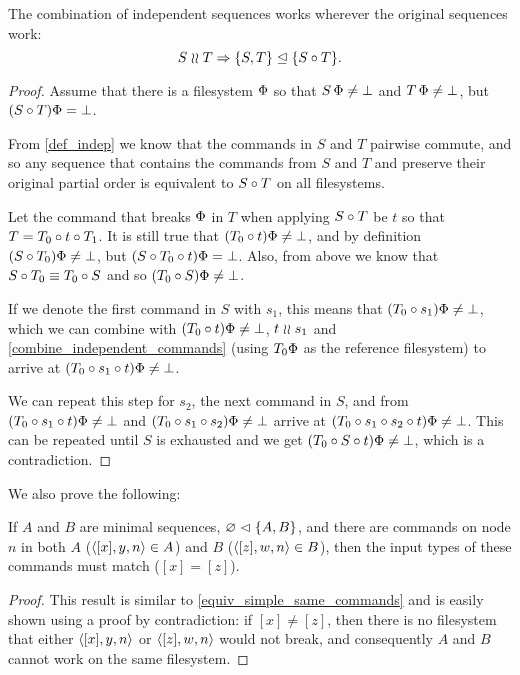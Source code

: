 \begin{mylem}\label{combine_independent_sequences}
The combination of independent sequences works wherever the original sequences work:
\[ S\mathrel{\wr\wr} T \Rightarrow {\{S,T\}}\trianglelefteq{\{S\circ T\}}. \]
\end{mylem}
\begin{proof}
Assume that there is a filesystem $\Phi$ so that
$S\,\Phi\neq\bot$ and $T\,\Phi\neq\bot$, but
$(S\circ T)\Phi=\bot$.

From \cref{def_indep} we know that
the commands in $S$ and $T$ pairwise commute, and so any sequence
that contains the commands from $S$ and $T$ and preserve their original partial order
is equivalent to $S\circ T$ on all filesystems.

Let the command that breaks $\Phi$ in $T$ when applying $S\circ T$ be $t$
so that $T=T_0\circ t\circ T_1$.
It is still true that $(T_0 \circ t)\Phi\neq\bot$,
and by definition $(S\circ T_0)\Phi\neq\bot$,
but $(S\circ T_0\circ t)\Phi=\bot$.
Also, from above we know that $S\circ T_0\equiv T_0\circ S$
and so $(T_0 \circ S)\Phi\neq\bot$.

If we denote the first command in $S$ with $s_1$,
this means that $(T_0 \circ s_1)\Phi\neq\bot$,
which we can combine with $(T_0 \circ t)\Phi\neq\bot$, $t\mathrel{\wr\wr} s_1$ and
\cref{combine_independent_commands}
(using $T_0\Phi$ as the reference filesystem)
to arrive at $(T_0 \circ s_1\circ t)\Phi\neq\bot$.

We can repeat this step for $s_2$, the next command in $S$,
and from 
$(T_0 \circ s_1\circ t)\Phi\neq\bot$
and
$(T_0 \circ s_1\circ s_2)\Phi\neq\bot$
arrive at
$(T_0 \circ s_1\circ s_2\circ t)\Phi\neq\bot$.
This can be repeated until $S$ is exhausted and we get
$(T_0 \circ S\circ t)\Phi\neq\bot$, which is a contradiction.
\end{proof}

We also prove the following:

\begin{mylem}\label{worksinputmatch}
If $A$ and $B$ are minimal sequences, ${\varnothing}\vartriangleleft{\{A,B\}}$,
and there are commands on node $n$ in both $A$ ($\langle{[x],y,n}\rangle\in A$) and $B$ ($\langle{[z],w,n}\rangle\in B$),
then the input types of these commands must match ($[x]=[z]$).
\end{mylem}
\begin{proof}
This result is similar to \cref{equiv_simple_same_commands} and
is easily shown using a proof by contradiction: if $[x]\neq [z]$, then there is no filesystem that
either $\langle{[x],y,n}\rangle$ or $\langle{[z],w,n}\rangle$ would not break, 
and consequently $A$ and $B$ cannot work on the same filesystem.
\end{proof}


